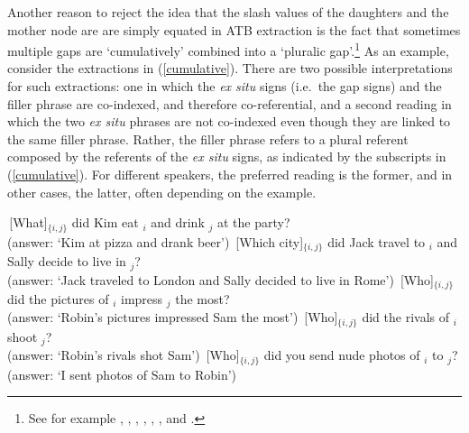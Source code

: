 \documentclass[output=paper
                ,modfonts
                ,nonflat
	        ,collection
	        ,collectionchapter
	        ,collectiontoclongg
 	        ,biblatex
                ,babelshorthands
                ,newtxmath
                ,draftmode
                ,colorlinks, citecolor=brown
]{./langsci/langscibook}
\begin{document}
Another reason to reject the idea that  the {\sc slash} values of the daughters and the mother node are are simply equated in ATB extraction is the fact that sometimes multiple gaps are `cumulatively' combined into a `pluralic gap'.\footnote{See for example  \citet{munn98atb,munn99atb},  \citet[136, 160]{postal98},
    \citet[125]{kehler},
 \citet{gawronkehlersalt}, 
 \citet{zhang}, \citet{chavessubjexp}, and \citet{Vicente2016-NELS46}.}
As an example, consider the extractions in (\ref{cumulative}). There are two possible interpretations
for such extractions: one in which the \emph{ex situ} signs (i.e.\ the gap signs) and the filler phrase are co-indexed, and therefore co-referential, and a second reading in which the two \emph{ex situ} phrases are not co-indexed even though they are linked to the same filler phrase.  Rather, the filler phrase refers to a plural
 referent composed by the referents of the \emph{ex situ} signs, as indicated by the subscripts 
in (\ref{cumulative}). For different speakers, the preferred reading is the former, and in other cases,
the latter, often depending on the example.

\eal \label{cumulative}
\ex
\,[What]$_{\lbrace i,j \rbrace}$ did Kim eat \spc$_i$ and drink \spc$_j$ at the party?\\
(answer: `Kim at pizza and drank beer')
\ex \,[Which city]$_{\lbrace i,j \rbrace}$ did Jack travel to \spc$_i$ and Sally decide to live in \spc$_j$?\\
(answer: `Jack traveled to London and Sally decided to live in Rome')
\ex \,[Who]$_{\lbrace i,j \rbrace}$ did the pictures of \spc$_i$ impress \spc$_j$ the most?\\
(answer: `Robin's pictures impressed Sam the most')
\ex \,[Who]$_{\lbrace i,j \rbrace}$ did the rivals of \spc$_i$ shoot \spc$_j$?\\
(answer: `Robin's rivals shot Sam')
\ex \,[Who]$_{\lbrace i,j \rbrace}$ did you send nude photos of \spc$_i$ to \spc$_j$?\\
(answer: `I sent photos of Sam to Robin')
\zl
\end{document}
